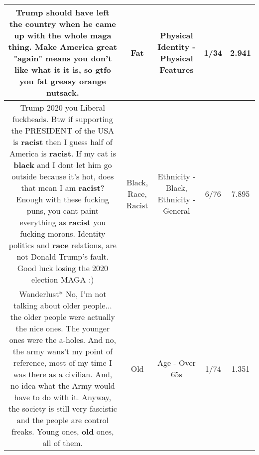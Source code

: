\documentclass[11pt]{article}
\newlength\mylength
\begin{document}
\begin{center}
\begin{longtable}{|C{.65\mylength}|C{.30\mylength}|C{.12\mylength}|C{.12\mylength}|C{.12\mylength}|}
  \small Trump should have left the country when he came up with the whole maga thing. Make America great "again" means you don't like what it it is, so gtfo you \textbf{fat} greasy orange nutsack.\normalsize   & Fat & Physical Identity - Physical Features & 1/34 & 2.941 \\  \hline
  \small Trump 2020 you Liberal fuckheads. Btw if supporting the PRESIDENT of the USA is \textbf{racist} then I guess half of America is \textbf{racist}. If my cat is \textbf{black} and I dont let him go outside because it's hot, does that mean I am \textbf{racist}? Enough with these fucking puns, you cant paint everything as \textbf{racist} you fucking morons. Identity politics and \textbf{race} relations, are not Donald Trump's fault. Good luck losing the 2020 election MAGA :)\normalsize   & Black, Race, Racist & Ethnicity - Black, Ethnicity - General & 6/76 & 7.895 \\  \hline
  \small * Wanderlust* No, I'm not talking about older people... the older people were actually the nice ones.  The younger ones were the a-holes.  And no, the army wans't my point of reference, most of my time I was there as a civilian.  And, no idea what the Army would have to do with it.  Anyway, the society is still very fascistic and the people are control freaks.  Young ones, \textbf{old} ones, all of them.\normalsize   & Old & Age - Over 65s & 1/74 & 1.351 \\  \hline

\end{longtable}
\end{center}
\end{document}
